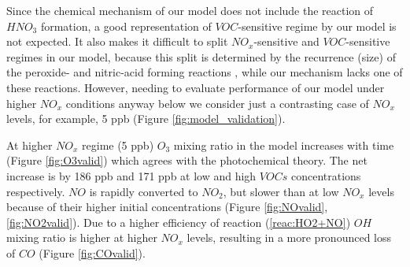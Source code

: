\documentclass[11pt,a4paper]{article}
\begin{document}
Since the chemical mechanism of our model does not include the reaction of $HNO_3$ formation, a good representation of $VOC$-sensitive regime by our model is not expected. It also makes it difficult to split $NO_x$-sensitive and $VOC$-sensitive regimes in our model, because this split is determined by the recurrence (size) of the peroxide- and nitric-acid forming reactions \citep{Sillman1999}, while our mechanism lacks one of these reactions. However, needing to evaluate performance of our model under higher $NO_x$ conditions anyway below we consider just a contrasting case of $NO_x$ levels, for example, 5 ppb (Figure \ref{fig:model_validation}).

At higher $NO_x$ regime (5 ppb) $O_3$ mixing ratio in the model increases with time (Figure \ref{fig:O3valid}) which agrees with the photochemical theory. The net increase is by 186 ppb and 171 ppb at low and high $VOCs$ concentrations respectively. $NO$ is rapidly converted to $NO_2$, but slower than at low $NO_x$ levels because of their higher initial concentrations (Figure \ref{fig:NOvalid}, \ref{fig:NO2valid}). Due to a higher efficiency of reaction (\ref{reac:HO2+NO}) $OH$ mixing ratio is higher at higher $NO_x$ levels, resulting in a more pronounced loss of $CO$ (Figure \ref{fig:COvalid}).
\end{document}
